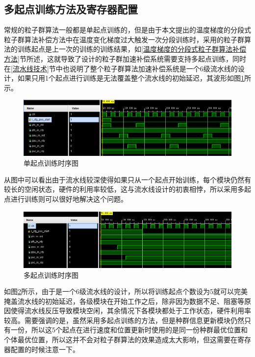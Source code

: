 \subsection{多起点训练方法及寄存器配置}
常规的粒子群算法一般都是单起点训练的，但是由于本文提出的温度梯度的分段式粒子群算法补偿方法中在温度变化梯度过大触发一次分段训练时，采用的粒子群算法的训练起点是上一次的训练的训练结果，如\ref{温度梯度的分段式粒子群算法补偿方法}节所述，这就导致了设计的粒子群加速补偿系统需要支持多起点训练，同时在\ref{流水线技术}节中也说明了整个粒子群算法加速补偿系统是一个6级流水线的设计，如果只用1个起点进行训练是无法覆盖整个流水线的初始延迟，其波形如图\ref{fig:单起点训练时序图}所示。
\begin{figure}[htb]
    \centering
    \includegraphics[width=14cm]{fig/5-fig/单起点训练时序图.jpg}
    \caption{单起点训练时序图}
    \label{fig:单起点训练时序图}
\end{figure}

从图中可以看出由于流水线较深使得如果只从一个起点开始训练，每个模块仍然有较长的空闲状态，硬件的利用率较低，这与流水线设计的初衷相悖，所以采用多起点进行训练则可以很好地解决这个问题。
\begin{figure}[htb]
    \centering
    \includegraphics[width=14cm]{fig/5-fig/多起点训练时序图.jpg}
    \caption{多起点训练时序图}
    \label{fig:多起点训练时序图}
\end{figure}

如图\ref{fig:多起点训练时序图}所示，由于是一个6级流水线的设计，所以将训练起点个数设为5就可以完美掩盖流水线的初始延迟，各级模块在开始工作之后，除非因为数据不足、阻塞等原因使得流水线反压导致模块空闲，其余情况下各模块都处于工作状态，硬件利用率较高。需要强调的是，虽然采用多起点训练的方法，但是种群信息更新模块仍然只有一份，所以这5个起点在进行速度和位置更新时使用的是同一份种群最优位置和个体最优位置，所以这并不会对粒子群算法的效果造成太大影响，但这需要在寄存器配置的时候注意一下。

